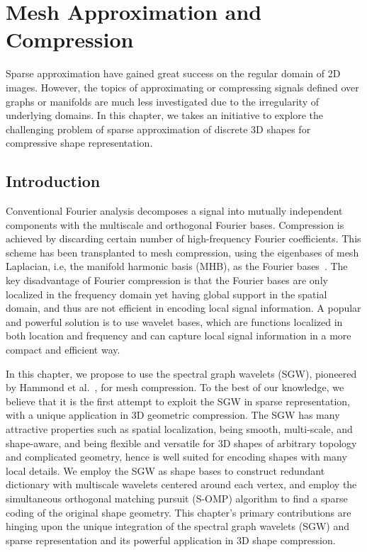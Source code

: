 \chapter{Mesh Approximation and Compression}

Sparse approximation have gained great success on the regular domain 
of 2D images. However, the topics of approximating or compressing signals defined 
over graphs or manifolds are much less investigated
due to the irregularity of underlying domains. In this chapter, we
takes an initiative to explore the challenging problem of sparse
approximation of discrete 3D shapes for compressive shape representation.

\section{Introduction}

Conventional Fourier analysis decomposes a signal into mutually
independent components with the multiscale and orthogonal Fourier
bases. Compression is achieved by discarding certain number of
high-frequency Fourier coefficients. This scheme has been transplanted
to mesh compression, using the eigenbases of mesh Laplacian, i.e, the
manifold harmonic basis (MHB), as the Fourier
bases~\cite{Karni2000}. The key disadvantage of Fourier
compression is that the Fourier bases are only localized in the
frequency domain yet having global support in the spatial domain, and
thus are not efficient in encoding local signal information. A popular
and powerful solution is to use wavelet bases, which are functions
localized in both location and frequency and can capture local signal
information in a more compact and efficient way.

In this chapter, we propose to use the spectral graph wavelets (SGW),
pioneered by Hammond et al.~\cite{Hammond2011}, for mesh
compression. To the best of our knowledge, we believe that it is the
first attempt to exploit the SGW in sparse representation, with a
unique application in 3D geometric compression. The SGW has many
attractive properties such as spatial localization, being smooth,
multi-scale, and shape-aware, and being flexible and versatile for 3D
shapes of arbitrary topology and complicated geometry, hence is well
suited for encoding shapes with many local details. We employ the SGW
as shape bases to construct redundant dictionary with multiscale
wavelets centered around each vertex, and employ the simultaneous
orthogonal matching pursuit (S-OMP) algorithm to find a sparse coding
of the original shape geometry. This chapter's primary contributions are
hinging upon the unique integration of the spectral graph wavelets
(SGW) and sparse representation and its powerful application in 3D
shape compression.


